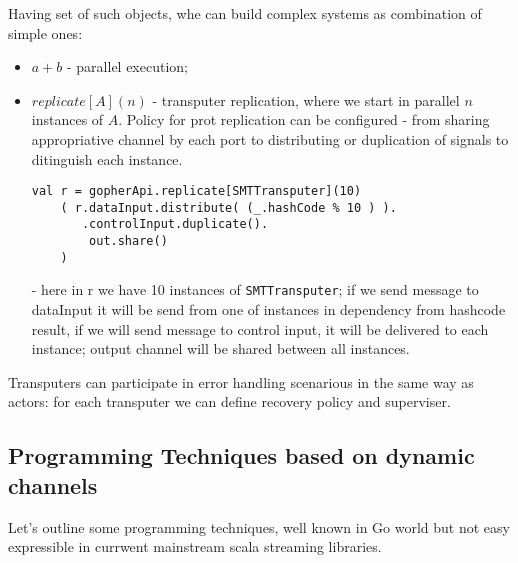 \documentclass[12pt]{article}
\begin{document}
  Having set of such objects, whe can build complex systems as combination of simple ones:
  \begin{itemize}
    \item $a+b$ - parallel execution; 
    \item $replicate[A](n)$ - transputer replication, where we start in parallel $n$ instances
  of $A$. Policy for prot replication can be configured - from sharing appropriative channel by each port to distributing   or duplication of signals to ditinguish each instance.
\begin{Verbatim}[fontsize=\small]
 val r = gopherApi.replicate[SMTTransputer](10)
    ( r.dataInput.distribute( (_.hashCode % 10 ) ).
       .controlInput.duplicate().
        out.share()
    )
\end{Verbatim}
    - here in r we have 10 instances of \verb|SMTTransputer|; if we send message to dataInput it will be send from one of instances in dependency from hashcode result, if we will send message to control input, it will be delivered to each instance; output channel will be shared between all instances.
  \end{itemize}

  Transputers can participate in error handling scenarious in the same way as actors: for each transputer we can define recovery policy and superviser.

\subsection{ Programming Techniques based on dynamic channels  }

 Let's outline some programming techniques, well known in Go world but not easy expressible in currwent mainstream scala streaming libraries. 
\end{document}
